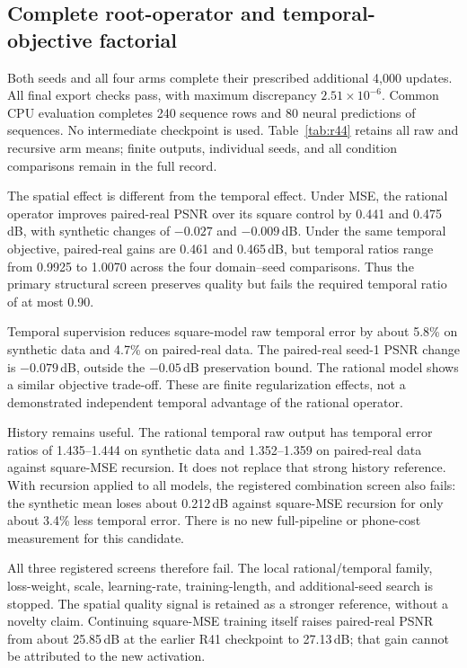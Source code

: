 \subsection{Complete root-operator and temporal-objective factorial}
\label{sec:r44}

Both seeds and all four arms complete their prescribed additional 4,000
updates. All final export checks pass, with maximum discrepancy
$2.51\!\times\!10^{-6}$. Common CPU evaluation completes 240 sequence rows
and 80 neural predictions of sequences. No intermediate checkpoint is used.
Table~\ref{tab:r44} retains all raw and recursive arm means; finite outputs,
individual seeds, and all condition comparisons remain in the full record.

The spatial effect is different from the temporal effect. Under MSE,
the rational operator improves paired-real PSNR over its square control by
0.441 and 0.475\,dB, with synthetic changes of $-0.027$ and $-0.009$\,dB.
Under the same temporal objective, paired-real gains are 0.461 and
0.465\,dB, but temporal ratios range from 0.9925 to 1.0070 across the
four domain--seed comparisons. Thus the primary structural screen preserves
quality but fails the required temporal ratio of at most 0.90.

Temporal supervision reduces square-model raw temporal error by about
5.8\% on synthetic data and 4.7\% on paired-real data. The paired-real
seed-1 PSNR change is $-0.079$\,dB, outside the $-0.05$\,dB preservation
bound. The rational model shows a similar objective trade-off. These are
finite regularization effects, not a demonstrated independent temporal
advantage of the rational operator.

History remains useful. The rational temporal raw output has temporal
error ratios of 1.435--1.444 on synthetic data and 1.352--1.359 on paired-real
data against square-MSE recursion. It does not replace that strong history
reference. With recursion applied to all models, the registered combination
screen also fails: the synthetic mean loses about 0.212\,dB against
square-MSE recursion for only about 3.4\% less temporal error. There is no
new full-pipeline or phone-cost measurement for this candidate.

All three registered screens therefore fail. The local rational/temporal
family, loss-weight, scale, learning-rate, training-length, and additional-seed
search is stopped. The spatial quality signal is retained as a stronger
reference, without a novelty claim. Continuing square-MSE training itself
raises paired-real PSNR from about 25.85\,dB at the earlier R41 checkpoint
to 27.13\,dB; that gain cannot be attributed to the new activation.

